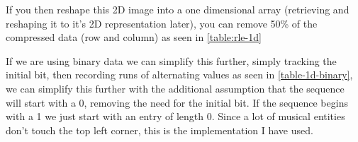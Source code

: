 If you then reshape this 2D image into a one dimensional array (retrieving and reshaping it to it's 2D representation later), you can remove 50\% of the compressed data (row and column) as seen in \cref{table:rle-1d}

If we are using binary data we can simplify this further, simply tracking the initial bit, then recording runs of alternating values as seen in \cref{table-1d-binary}, we can simplify this further with the additional assumption \parencite{fujinaga1996adaptive} that the sequence will start with a 0, removing the need for the initial bit. If the sequence begins with a 1 we just start with an entry of length 0. Since a lot of musical entities don't touch the top left corner, this is the implementation I have used.
